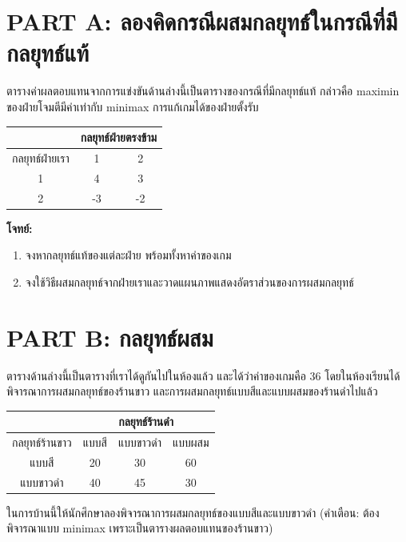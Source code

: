 \section*{PART A: ลองคิดกรณีผสมกลยุทธ์ในกรณีที่มีกลยุทธ์แท้}
ตารางค่าผลตอบแทนจากการแข่งขันด้านล่างนี้เป็นตารางของกรณีที่มีกลยุทธ์แท้ กล่าวคือ maximin ของฝ่ายโจมตีมีค่าเท่ากับ minimax การแก้เกมได้ของฝ่ายตั้งรับ
\begin{center}
\begin{tabular}{|c|cc|}
	\hline
	               & \multicolumn{2}{c|}{กลยุทธ์ฝ่ายตรงข้าม}               \\ \hline
	กลยุทธ์ฝ่ายเรา        & \multicolumn{1}{c|}{1}  & \multicolumn{1}{c|}{2}   \\ \hline
	1              & \multicolumn{1}{c|}{4}  & \multicolumn{1}{c|}{3}   \\ \hline
	2              & \multicolumn{1}{c|}{-3} & \multicolumn{1}{c|}{-2}  \\ \hline
\end{tabular}
\end{center}
\textbf{โจทย์:}
\begin{enumerate}
	\item จงหากลยุทธ์แท้ของแต่ละฝ่าย พร้อมทั้งหาค่าของเกม
	\item จงใช้วิธีผสมกลยุทธ์จากฝ่ายเราและวาดแผนภาพแสดงอัตราส่วนของการผสมกลยุทธ์
\end{enumerate}

\section*{PART B: กลยุทธ์ผสม}
ตารางด้านล่างนี้เป็นตารางที่เราได้ดูกันไปในห้องแล้ว และได้ว่าค่าของเกมคือ 36 โดยในห้องเรียนได้พิจารณาการผสมกลยุทธ์ของร้านขาว และการผสมกลยุทธ์แบบสีและแบบผสมของร้านดำไปแล้ว
\begin{center}
	\begin{tabular}{|c|ccc|}
		\hline
		& \multicolumn{3}{c|}{กลยุทธ์ร้านดำ}               \\ \hline
		กลยุทธ์ร้านขาว & \multicolumn{1}{c|}{แบบสี}  & \multicolumn{1}{c|}{แบบขาวดำ}   & \multicolumn{1}{c|}{แบบผสม}\\ \hline
		แบบสี     & \multicolumn{1}{c|}{20}  & \multicolumn{1}{c|}{30}   & \multicolumn{1}{c|}{60}\\ \hline
		แบบขาวดำ   & \multicolumn{1}{c|}{40} & \multicolumn{1}{c|}{45}  & \multicolumn{1}{c|}{30}\\ \hline
	\end{tabular}
\end{center}
ในการบ้านนี้ให้นักศึกษาลองพิจารณาการผสมกลยุทธ์ของแบบสีและแบบขาวดำ (คำเตือน: ต้องพิจารณาแบบ minimax เพราะเป็นตารางผลตอบแทนของร้านขาว)

